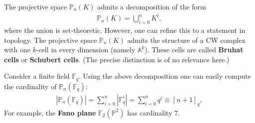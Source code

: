     \begin{property}
        The projective space $\mathbb{P}_n(K)$ admits a decomposition of the form
        \begin{gather}
            \mathbb{P}_n(K) = \bigcup_{i=0}^nK^i,
        \end{gather}
        where the union is set-theoretic. However, one can refine this to a statement in topology. The projective space $\mathbb{P}_n(K)$ admits the structure of a CW complex with one $k$-cell in every dimension (namely $\mathbb{A}^k$). These cells are called \textbf{Bruhat cells} or \textbf{Schubert cells}. (The precise distinction is of no relevance here.)
    \end{property}

    \begin{example}
        Consider a finite field $\mathbb{F}_q$. Using the above decomposition one can easily compute the cardinality of $\mathbb{P}_n(\mathbb{F}_q)$:
        \begin{gather}
            |\mathbb{P}_n(\mathbb{F}_q)| = \sum_{i=0}^n|\mathbb{F}_q^i| = \sum_{i=0}^nq^i \equiv [n+1]_q,
        \end{gather}
        For example, the \textbf{Fano plane} $\mathbb{F}_2(\mathbb{P}^2)$ has cardinality 7.
    \end{example}

